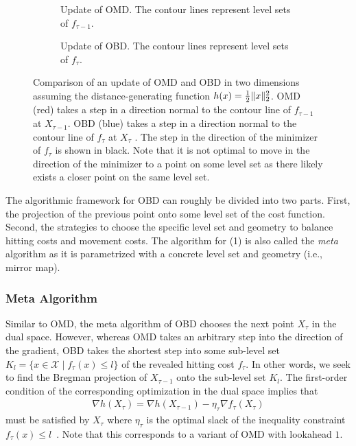 \begin{figure}
    \begin{subfigure}[b]{\textwidth}
    \centering
    
    \caption{Update of OMD. The contour lines represent level sets of $f_{\tau-1}$.}
    \end{subfigure}
    \par\bigskip
    \begin{subfigure}[b]{\textwidth}
    \centering
    
    \caption{Update of OBD. The contour lines represent level sets of $f_{\tau}$.}
    \end{subfigure}
    \caption{Comparison of an update of OMD and OBD in two dimensions assuming the distance-generating function $h(x) = \frac{1}{2} \lVert x\rVert_2^2$. OMD (red) takes a step in a direction normal to the contour line of $f_{\tau-1}$ at $X_{\tau-1}$. OBD (blue) takes a step in a direction normal to the contour line of $f_{\tau}$ at $X_{\tau}$ \cite{Chen2018}. The step in the direction of the minimizer of $f_{\tau}$ is shown in black. Note that it is not optimal to move in the direction of the minimizer to a point on some level set as there likely exists a closer point on the same level set.}
    \label{fig:comparison_of_an_update_of_omd_and_obd}
\end{figure}

The algorithmic framework for OBD can roughly be divided into two parts. First, the projection of the previous point onto some level set of the cost function.  Second, the strategies to choose the specific level set and geometry to balance hitting costs and movement costs. The algorithm for (1) is also called the \emph{meta} algorithm as it is parametrized with a concrete level set and geometry (i.e., mirror map).

\subsubsection{Meta Algorithm}

Similar to OMD, the meta algorithm of OBD chooses the next point $X_{\tau}$ in the dual space. However, whereas OMD takes an arbitrary step into the direction of the gradient, OBD takes the shortest step into some sub-level set $K_l = \{x \in \mathcal{X} \mid f_{\tau}(x) \leq l\}$ of the revealed hitting cost $f_{\tau}$. In other words, we seek to find the Bregman projection of $X_{\tau-1}$ onto the sub-level set $K_l$. The first-order condition of the corresponding optimization in the dual space implies that \begin{align}\label{eq:pbd:first_order_condition}
    \nabla h(X_{\tau}) = \nabla h(X_{\tau-1}) - \eta_{\tau} \nabla f_{\tau}(X_{\tau})
\end{align} must be satisfied by $X_{\tau}$ where $\eta_{\tau}$ is the optimal slack of the inequality constraint $f_{\tau}(x) \leq l$~\cite{Chen2018}. Note that this corresponds to a variant of OMD with lookahead $1$.

